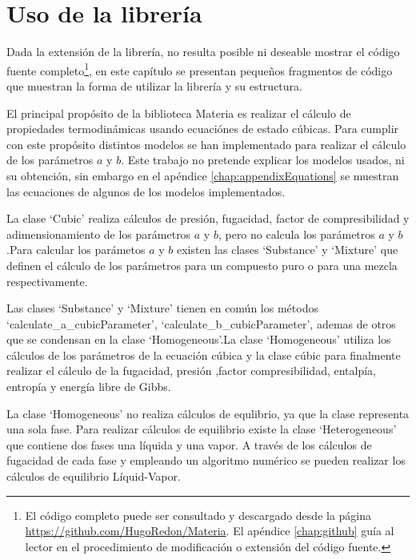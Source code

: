 \chapter{Uso de la librería}\label{chap:libraryUse}
	
	Dada la extensión de la librería, no resulta posible ni deseable mostrar el código fuente completo\footnote{El código completo puede ser consultado y descargado desde la página \url{https://github.com/HugoRedon/Materia}. El apéndice \ref{chap:github} guía al lector en el procedimiento de modificación o extensión del código fuente.}, en este capítulo se presentan pequeños fragmentos de código que muestran la forma de utilizar la librería y su estructura.

	El principal propósito de la biblioteca Materia es realizar el cálculo de propiedades termodinámicas usando ecuaciónes de estado cúbicas. Para cumplir con este propósito distintos modelos se han implementado para realizar el cálculo de los parámetros $a$ y $b$. Este trabajo no pretende explicar los modelos usados, ni su obtención, sin embargo en el apéndice \ref{chap:appendixEquations} se muestran las ecuaciones de algunos de los modelos implementados. 
		
	La clase `Cubic' realiza cálculos de presión, fugacidad, factor de compresibilidad y adimensionamiento de los parámetros $a$ y $b$, pero no calcula los parámetros $a$ y $b$.Para calcular los parámetos $a$ y $b$ existen las clases `Substance' y `Mixture' que definen el cálculo de los parámetros para un compuesto puro o para una mezcla respectivamente. 

	Las clases `Substance' y `Mixture' tienen en común los métodos `calculate\_a\_cubicParameter', `calculate\_b\_cubicParameter', ademas de otros que se condensan en la clase `Homogeneous'.La clase `Homogeneous' utiliza los cálculos de los parámetros de la ecuación cúbica y la clase cúbic para finalmente realizar el cálculo de la fugacidad, presión ,factor compresibilidad, entalpía, entropía y energía libre de Gibbs.

	La clase `Homogeneous' no realiza cálculos de equlibrio, ya que la clase representa una sola fase. Para realizar cálculos de equilibrio existe la clase `Heterogeneous' que contiene dos fases una líquida y una vapor. A través de los cálculos de fugacidad de cada fase y empleando un algoritmo numérico se pueden realizar los cálculos de equilibrio Líquid-Vapor.


